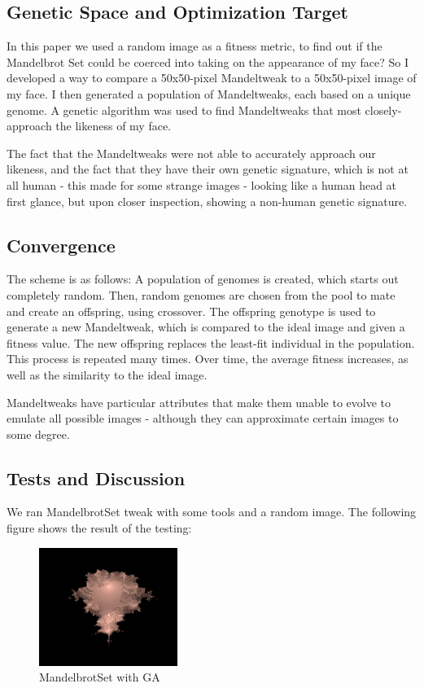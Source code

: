 \documentclass[fleqn,10pt]{SelfArx} %
\begin{document}
\subsection{Genetic Space and Optimization Target}
In this paper we used a random image as a fitness metric, to find out
if the Mandelbrot Set could be coerced into taking on the appearance
of my face? So I developed a way to compare a 50x50-pixel Mandeltweak
to a 50x50-pixel image of my face. I then generated a population of
Mandeltweaks, each based on a unique genome. A genetic algorithm was
used to find Mandeltweaks that most closely-approach the likeness of
my face.

The fact that the Mandeltweaks were not able to accurately approach
our likeness, and the fact that they have their own genetic signature,
which is not at all human - this made for some strange images -
looking like a human head at first glance, but upon closer inspection,
showing a non-human genetic signature.

\subsection{Convergence}

The scheme is as follows: A population of genomes is created, which
starts out completely random. Then, random genomes are chosen from the
pool to mate and create an offspring, using crossover. The offspring
genotype is used to generate a new Mandeltweak, which is compared to
the ideal image and given a fitness value. The new offspring replaces
the least-fit individual in the population. This process is repeated
many times. Over time, the average fitness increases, as well as the
similarity to the ideal image.


Mandeltweaks have particular attributes that make them unable to
evolve to emulate all possible images - although they can approximate
certain images to some degree.


\subsection{Tests and Discussion}

We  ran MandelbrotSet tweak with some tools and a random
image. The following figure shows the result of the testing:


\begin{figure}[h!]
  \centering
      \includegraphics[width=0.4\textwidth]{tweak.png}
  \caption{MandelbrotSet with GA}
\end{figure}
\end{document}
